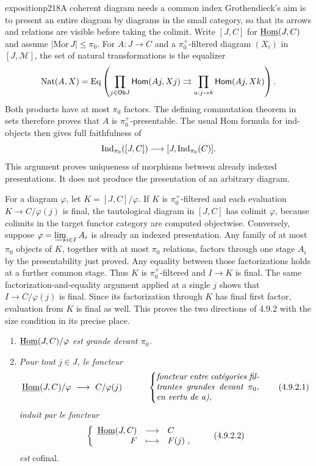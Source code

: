 
\begin{dcomment}{exposition}{p218}{A coherent diagram needs a common index}
Grothendieck's aim is to present an entire diagram by diagrams in the small category, so that its arrows and relations are visible before taking the colimit. Write $[J,C]$ for $\underline{\operatorname{Hom}}(J,C)$ and assume $|\mathrm{Mor}\,J|\leq\pi_0$. For $A:J\to C$ and a $\pi_0^+$-filtered diagram $(X_i)$ in $[J,\mathcal M]$, the set of natural transformations is the equalizer
\[
 \operatorname{Nat}(A,X)=
 \operatorname{Eq}\left(
 \prod_{j\in\mathsf{Ob} J}\mathsf{Hom}(Aj,Xj)
 \rightrightarrows
 \prod_{u:j\to k}\mathsf{Hom}(Aj,Xk)\right).
\]
Both products have at most $\pi_0$ factors. The defining commutation theorem in sets therefore proves that $A$ is $\pi_0^+$-presentable. The usual Hom formula for ind-objects then gives full faithfulness of
\[
 \operatorname{Ind}_{\pi_0}([J,C])\longrightarrow[J,\operatorname{Ind}_{\pi_0}(C)].
\]
This argument proves uniqueness of morphisms between already indexed presentations. It does not produce the presentation of an arbitrary diagram.

For a diagram $\varphi$, let $K=[J,C]/\varphi$. If $K$ is $\pi_0^+$-filtered and each evaluation $K\to C/\varphi(j)$ is final, the tautological diagram in $[J,C]$ has colimit $\varphi$, because colimits in the target functor category are computed objectwise. Conversely, suppose $\varphi=\varinjlim_{i\in I}A_i$ is already an indexed presentation. Any family of at most $\pi_0$ objects of $K$, together with at most $\pi_0$ relations, factors through one stage $A_i$ by the presentability just proved. Any equality between those factorizations holds at a further common stage. Thus $K$ is $\pi_0^+$-filtered and $I\to K$ is final. The same factorization-and-equality argument applied at a single $j$ shows that $I\to C/\varphi(j)$ is final. Since its factorization through $K$ has final first factor, evaluation from $K$ is final as well. This proves the two directions of 4.9.2 with the size condition in its precise place.
\end{dcomment}


\begin{enumerate}[leftmargin=*]
\item[\textit{a)}] $\underline{\operatorname{Hom}}(J, C)/\varphi$ \textit{est grande devant $\pi_0$.}
\item[\textit{b)}] \textit{Pour tout $j \in J$, le foncteur}
\[
\uHom(J, C)/\varphi \ \longrightarrow\ C/\varphi(j) \qquad\quad
\left\{
\parbox{0.35\textwidth}{\textit{foncteur entre catégories filtrantes grandes devant $\pi_0$, en vertu de a),}}
\right. \tag*{(4.9.2.1)}
\]
\textit{induit par le foncteur}
\[
\left\{
\begin{array}{rcl}
\uHom(J, C) & \longrightarrow & C \\
F & \longmapsto & F(j)\ ,
\end{array}
\right. \tag*{(4.9.2.2)}
\]
\textit{est} cofinal.
\end{enumerate}

